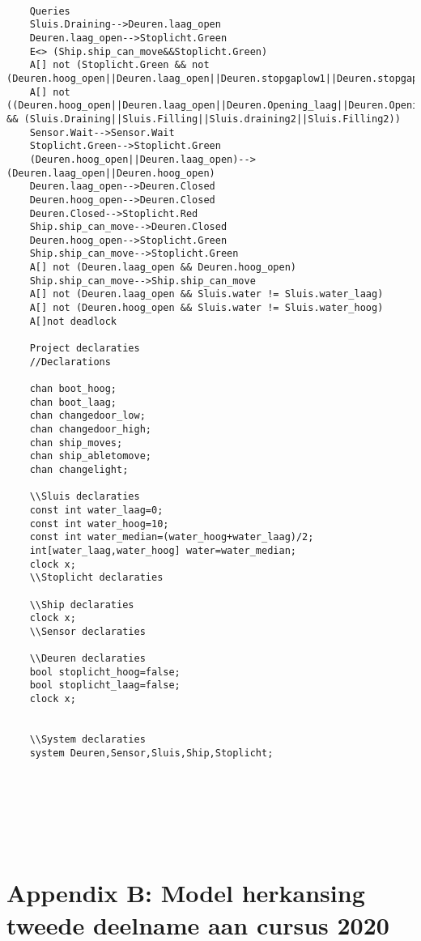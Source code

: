 \begin{verbatim}
	
	Queries
	Sluis.Draining-->Deuren.laag_open
	Deuren.laag_open-->Stoplicht.Green
	E<> (Ship.ship_can_move&&Stoplicht.Green)
	A[] not (Stoplicht.Green && not (Deuren.hoog_open||Deuren.laag_open||Deuren.stopgaplow1||Deuren.stopgaplow2||Deuren.stopgaphigh1||Deuren.stopgaphigh2))
	A[] not ((Deuren.hoog_open||Deuren.laag_open||Deuren.Opening_laag||Deuren.Opening_hoog||Deuren.Closing_hoog||Deuren.Closing_laag) && (Sluis.Draining||Sluis.Filling||Sluis.draining2||Sluis.Filling2))
	Sensor.Wait-->Sensor.Wait
	Stoplicht.Green-->Stoplicht.Green
	(Deuren.hoog_open||Deuren.laag_open)-->(Deuren.laag_open||Deuren.hoog_open)
	Deuren.laag_open-->Deuren.Closed
	Deuren.hoog_open-->Deuren.Closed
	Deuren.Closed-->Stoplicht.Red
	Ship.ship_can_move-->Deuren.Closed
	Deuren.hoog_open-->Stoplicht.Green
	Ship.ship_can_move-->Stoplicht.Green
	A[] not (Deuren.laag_open && Deuren.hoog_open)
	Ship.ship_can_move-->Ship.ship_can_move
	A[] not (Deuren.laag_open && Sluis.water != Sluis.water_laag)
	A[] not (Deuren.hoog_open && Sluis.water != Sluis.water_hoog)
	A[]not deadlock
	
	Project declaraties
	//Declarations
	
	chan boot_hoog;
	chan boot_laag;
	chan changedoor_low;
	chan changedoor_high;
	chan ship_moves;
	chan ship_abletomove;
	chan changelight;
	
	\\Sluis declaraties
	const int water_laag=0;
	const int water_hoog=10;
	const int water_median=(water_hoog+water_laag)/2;
	int[water_laag,water_hoog] water=water_median;
	clock x;
	\\Stoplicht declaraties
	
	\\Ship declaraties
	clock x;
	\\Sensor declaraties
	
	\\Deuren declaraties
	bool stoplicht_hoog=false;
	bool stoplicht_laag=false;
	clock x;
	
	
	\\System declaraties
	system Deuren,Sensor,Sluis,Ship,Stoplicht;
	
	
	
	
\end{verbatim}

\newpage
\section{\\ Appendix B: Model herkansing tweede deelname aan cursus 2020}

